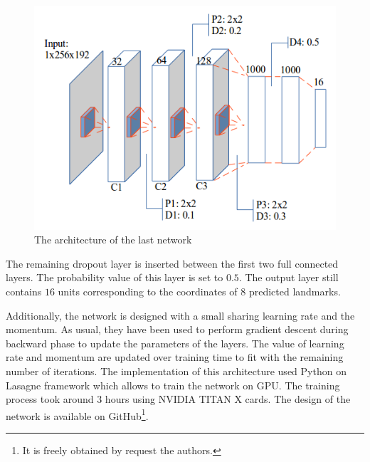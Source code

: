 \documentclass[conference]{IEEEtran}
\begin{document}
\begin{figure}[htbp]
	\centerline{\includegraphics[scale=0.45]{images/architecture3}}
	\caption{The architecture of the last network}
	\label{figarch}
\end{figure}

The remaining dropout layer is inserted between the first two full connected layers. The probability value of this layer is set to $0.5$. The output layer still contains $16$ units corresponding to the coordinates of $8$ predicted landmarks.%

Additionally, the network is designed with a small sharing learning rate and the momentum. As usual, they have been used to perform gradient descent during backward phase to update the parameters of the layers. The value of learning rate and momentum are updated over training time to fit with the remaining number of iterations. The implementation of this architecture used Python on Lasagne framework \cite{lasagne} which allows to train the network on GPU. The training process took around 3 hours using NVIDIA TITAN X cards. The design of the network is available on GitHub\footnote{It is freely obtained by request the authors.}.
\end{document}
